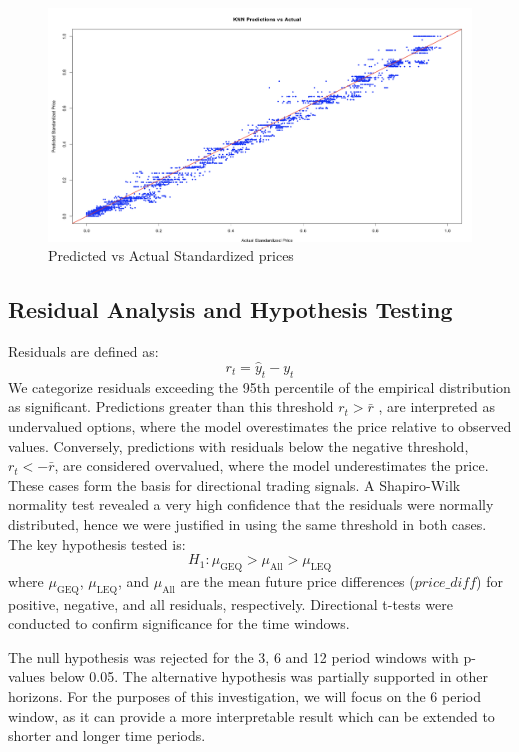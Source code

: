 \documentclass{article}
\begin{document}
\begin{figure}[h]
  \centering
  \includegraphics[width=0.8\linewidth]{data/results/knn_preds.png}
  \caption{Predicted vs Actual Standardized prices}
  \label{fig:knn-preds}
\end{figure}

\subsection{Residual Analysis and Hypothesis Testing}

Residuals are defined as:
\[
r_t = \hat{y}_t - y_t
\]
We categorize residuals exceeding the 95th percentile of the empirical distribution as significant. Predictions greater than this threshold $r_t > \bar{r}$ , are interpreted as undervalued options, where the model overestimates the price relative to observed values. Conversely, predictions with residuals below the negative threshold, $r_t < -\bar{r}$, are considered overvalued, where the model underestimates the price. These cases form the basis for directional trading signals. A Shapiro-Wilk normality test revealed a very high confidence that the residuals were normally distributed, hence we were justified in using the same threshold in both cases.
The key hypothesis tested is:
\[
H_1: \mu_{\text{GEQ}} > \mu_{\text{All}} > \mu_{\text{LEQ}}
\]
where \( \mu_{\text{GEQ}} \), \( \mu_{\text{LEQ}} \), and \( \mu_{\text{All}} \) are the mean future price differences ($price\_diff$) for positive, negative, and all residuals, respectively. Directional t-tests were conducted to confirm significance for the time windows.

The null hypothesis was rejected for the 3, 6 and 12 period windows with p-values below 0.05. The alternative hypothesis was partially supported in other horizons. For the purposes of this investigation, we will focus on the 6 period window, as it can provide a more interpretable result which can be extended to shorter and longer time periods. 
\end{document}

